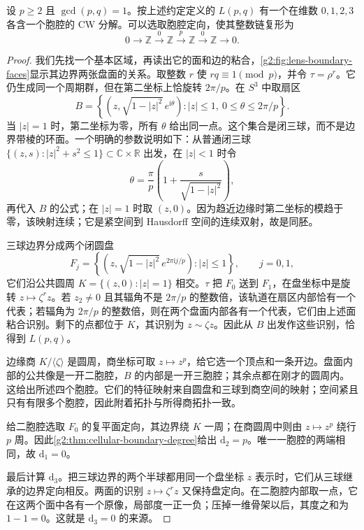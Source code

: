 \begin{proposition}\label{g2:prop:lens-cellular-model}
	设 \(p\geq2\) 且 \(\gcd(p,q)=1\)。按上述约定定义的 \(L(p,q)\) 有一个在维数 \(0,1,2,3\) 各含一个胞腔的 CW 分解。可以选取胞腔定向，使其整数链复形为
	\begin{equation}\label{g2:eq:lens-cellular-complex}
		0\longrightarrow\mathbb Z\xrightarrow{0}\mathbb Z
		\xrightarrow{p}\mathbb Z\xrightarrow{0}\mathbb Z
		\longrightarrow0.
	\end{equation}
\end{proposition}
\begin{proof}
	我们先找一个基本区域，再读出它的面和边的粘合，\cref{g2:fig:lens-boundary-faces}显示其边界两张盘面的关系。取整数 \(r\) 使 \(rq\equiv1\pmod p\)，并令 \(\tau=\rho^r\)。它仍生成同一个周期群，但在第二坐标上恰旋转 \(2\pi/p\)。在 \(S^3\) 中取扇区
	\[
		B=\left\{\left(z,\sqrt{1-|z|^2}\,e^{\mathrm{i}\theta}\right):
		|z|\leq1,\ 0\leq\theta\leq2\pi/p\right\}.
	\]
	当 \(|z|=1\) 时，第二坐标为零，所有 \(\theta\) 给出同一点。这个集合是闭三球，而不是边界带棱的环面。一个明确的参数说明如下：从普通闭三球 \(\{(z,s):|z|^2+s^2\leq1\}\subset\mathbb C\times\mathbb R\) 出发，在 \(|z|<1\) 时令
	\[
		\theta=\frac{\pi}{p}\left(1+\frac{s}{\sqrt{1-|z|^2}}\right),
	\]
	再代入 \(B\) 的公式；在 \(|z|=1\) 时取 \((z,0)\)。因为趋近边缘时第二坐标的模趋于零，该映射连续；它是紧空间到 Hausdorff 空间的连续双射，故是同胚。

	三球边界分成两个闭圆盘
	\[
		F_j=\left\{\left(z,\sqrt{1-|z|^2}\,e^{2\pi\mathrm{i}j/p}\right):|z|\leq1\right\},
		\qquad j=0,1,
	\]
	它们沿公共圆周 \(K=\{(z,0):|z|=1\}\) 相交。\(\tau\) 把 \(F_0\) 送到 \(F_1\)，在盘坐标中是旋转 \(z\mapsto\zeta^r z\)。若 \(z_2\ne0\) 且其辐角不是 \(2\pi/p\) 的整数倍，该轨道在扇区内部恰有一个代表；若辐角为 \(2\pi/p\) 的整数倍，则在两个盘面内部各有一个代表，它们由上述面粘合识别。剩下的点都位于 \(K\)，其识别为 \(z\sim\zeta z\)。因此从 \(B\) 出发作这些识别，恰得到 \(L(p,q)\)。

	边缘商 \(K/\langle\zeta\rangle\) 是圆周，商坐标可取 \(z\mapsto z^p\)，给它选一个顶点和一条开边。盘面内部的公共像是一开二胞腔，\(B\) 的内部是一开三胞腔；其余点都在刚才的圆周内。这给出所述四个胞腔。它们的特征映射来自圆盘和三球到商空间的映射；空间紧且只有有限多个胞腔，因此附着拓扑与所得商拓扑一致。

	给二胞腔选取 \(F_0\) 的复平面定向，其边界绕 \(K\) 一周；在商圆周中则由 \(z\mapsto z^p\) 绕行 \(p\) 周。因此\cref{g2:thm:cellular-boundary-degree}给出 \(\mathrm{d}_2=p\)。唯一一胞腔的两端相同，故 \(\mathrm{d}_1=0\)。

	最后计算 \(\mathrm{d}_3\)。把三球边界的两个半球都用同一个盘坐标 \(z\) 表示时，它们从三球继承的边界定向相反。两面的识别 \(z\mapsto\zeta^r z\) 又保持盘定向。在二胞腔内部取一点，它在这两个面中各有一个原像，局部度一正一负；压掉一维骨架以后，其度之和为 \(1-1=0\)。这就是 \(\mathrm{d}_3=0\) 的来源。
\end{proof}

